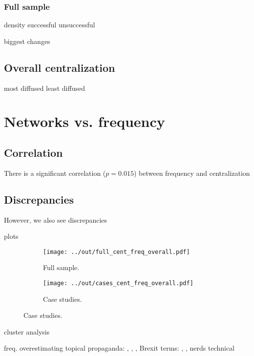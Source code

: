 \documentclass[draft, a4paper, abstract=on]{scrartcl}
\begin{document}
    \subsubsection{Full sample}

  density
  successful
  unsuccessful

  biggest changes

  \subsection{Overall centralization}

  most diffused
  least diffused

\section{Networks vs. frequency}

  \subsection{Correlation}

  There is a significant correlation ($p = 0.015$) between frequency and centralization

  \subsection{Discrepancies}

  However, we also see discrepancies

  plots

  \begin{figure}[H]
  \centering
  \begin{subfigure}{.45\linewidth}
  \caption{Full sample.}
  \centering
  \texttt{[image: ../out/full\_cent\_freq\_overall.pdf]}
  \end{subfigure}
  \begin{subfigure}{.45\linewidth}
  \caption{Case studies.}
  \centering
  \texttt{[image: ../out/cases\_cent\_freq\_overall.pdf]}
  \end{subfigure}
  \end{figure}

  cluster analysis

  freq. overestimating
  topical
  propaganda: , , , 
  Brexit terms: , , 
  nerds
  technical
\end{document}
